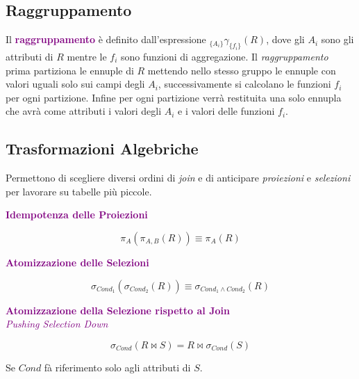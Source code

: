 \subsection{Raggruppamento}
Il \textbf{\textcolor{purple}{raggruppamento}} è definito dall'espressione $_{\{A_i\}}\gamma_{\{f_i\}}(R)$,
dove gli $A_i$ sono gli attributi di $R$ mentre le $f_i$ sono funzioni di aggregazione.
Il \emph{raggruppamento} prima partiziona le ennuple di $R$ mettendo nello stesso gruppo
le ennuple con valori uguali solo sui campi degli $A_i$, successivamente si calcolano le
funzioni $f_i$ per ogni partizione. Infine per ogni partizione verrà restituita una solo ennupla
che avrà come attributi i valori degli $A_i$ e i valori delle funzioni $f_i$.

\subsection{Trasformazioni Algebriche}
Permettono di scegliere diversi ordini di \emph{join} e di anticipare
\emph{proiezioni} e \emph{selezioni} per lavorare su tabelle più piccole.

\begin{center}
    \textbf{\textcolor{purple}{Idempotenza delle Proiezioni}}
\end{center}
\begin{equation}
    \pi_{A}(\pi_{A,B}(R)) \equiv \pi_{A}(R)
\end{equation}

\begin{center}
    \textbf{\textcolor{purple}{Atomizzazione delle Selezioni}}
\end{center}
\begin{equation}
    \sigma_{Cond_{1}}(\sigma_{Cond_{2}}(R)) \equiv \sigma_{Cond_{1} \land Cond_{2}}(R)
\end{equation}

\begin{center}
    \textbf{\textcolor{purple}{Atomizzazione della Selezione rispetto al Join}} \\
    \emph{\textcolor{purple}{Pushing Selection Down}}
\end{center}
\begin{equation}
    \sigma_{Cond}(R \bowtie S) = R \bowtie \sigma_{Cond}(S)
\end{equation}
\begin{center}
    Se $Cond$ fà riferimento solo agli attributi di $S$.
\end{center}

